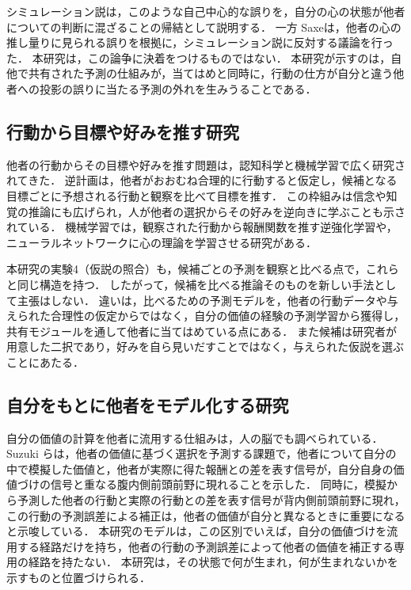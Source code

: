 シミュレーション説は，このような自己中心的な誤りを，自分の心の状態が他者についての判断に混ざることの帰結として説明する\cite{goldman2006simulating}．
一方 Saxe\cite{saxe2005against}は，他者の心の推し量りに見られる誤りを根拠に，シミュレーション説に反対する議論を行った．
本研究は，この論争に決着をつけるものではない．
本研究が示すのは，自他で共有された予測の仕組みが，当てはめと同時に，行動の仕方が自分と違う他者への投影の誤りに当たる予測の外れを生みうることである．

\subsection{行動から目標や好みを推す研究}\label{sec:related-inverse}
他者の行動からその目標や好みを推す問題は，認知科学と機械学習で広く研究されてきた．
逆計画\cite{baker2009action}は，他者がおおむね合理的に行動すると仮定し，候補となる目標ごとに予想される行動と観察を比べて目標を推す．
この枠組みは信念や知覚の推論にも広げられ\cite{baker2017rational}，人が他者の選択からその好みを逆向きに学ぶことも示されている\cite{jern2017people}．
機械学習では，観察された行動から報酬関数を推す逆強化学習\cite{ng2000algorithms}や，ニューラルネットワークに心の理論を学習させる研究\cite{rabinowitz2018machine}がある．

本研究の実験4（仮説の照合）も，候補ごとの予測を観察と比べる点で，これらと同じ構造を持つ．
したがって，候補を比べる推論そのものを新しい手法として主張はしない．
違いは，比べるための予測モデルを，他者の行動データや与えられた合理性の仮定からではなく，自分の価値の経験の予測学習から獲得し，共有モジュールを通して他者に当てはめている点にある．
また候補は研究者が用意した二択であり，好みを自ら見いだすことではなく，与えられた仮説を選ぶことにあたる．

\subsection{自分をもとに他者をモデル化する研究}\label{sec:related-self}
自分の価値の計算を他者に流用する仕組みは，人の脳でも調べられている．
Suzuki ら\cite{suzuki2012learning}は，他者の価値に基づく選択を予測する課題で，他者について自分の中で模擬した価値と，他者が実際に得た報酬との差を表す信号が，自分自身の価値づけの信号と重なる腹内側前頭前野に現れることを示した．
同時に，模擬から予測した他者の行動と実際の行動との差を表す信号が背内側前頭前野に現れ，この行動の予測誤差による補正は，他者の価値が自分と異なるときに重要になると示唆している．
本研究のモデルは，この区別でいえば，自分の価値づけを流用する経路だけを持ち，他者の行動の予測誤差によって他者の価値を補正する専用の経路を持たない．
本研究は，その状態で何が生まれ，何が生まれないかを示すものと位置づけられる．

